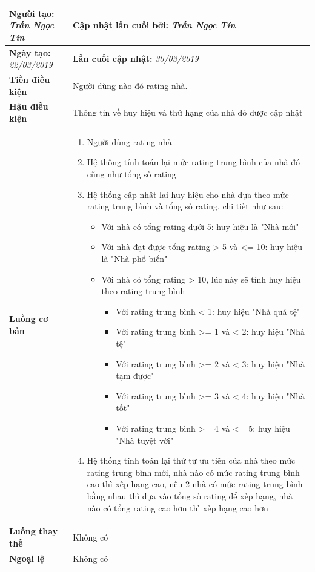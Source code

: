 \begin{enumerate}[label=\textbf{(\alph*)}]
\begin{center}
\begin{longtable}{ | l |p{10cm}|}
			\textbf{Người tạo:} \textit{Trần Ngọc Tín} & \textbf{Cập nhật lần cuối bởi:} \textit{Trần Ngọc Tín} \\ \hline
			\textbf{Ngày tạo:} \textit{22/03/2019} & \textbf{Lần cuối cập nhật:} \textit{30/03/2019} \\ \hline
			\textbf{Tiền điều kiện} &  Người dùng nào đó rating nhà. \\ \hline 
			\textbf{Hậu điều kiện} &  Thông tin về huy hiệu và thứ hạng của nhà đó được cập nhật \\ \hline 
			\textbf{Luồng cơ bản} & 
			\begin{enumerate}
		\item Người dùng rating nhà
		\item Hệ thống tính toán lại mức rating trung bình của nhà đó cũng như tổng số rating
		\item Hệ thống cập nhật lại huy hiệu cho nhà dựa theo mức rating trung bình và tổng số rating, chi tiết như sau:
		\begin{itemize}
		    \item Với nhà có tổng rating dưới 5: huy hiệu là "Nhà mới"
		    \item Với nhà đạt được tổng rating > 5 và <= 10: huy hiệu là "Nhà phổ biến"
		    \item Với nhà có tổng rating > 10, lúc này sẽ tính huy hiệu theo rating trung bình
		    \begin{itemize}
		        \item Với rating trung bình < 1: huy hiệu "Nhà quá tệ"
		        \item Với rating trung bình >= 1 và < 2: huy hiệu "Nhà tệ"
		        \item Với rating trung bình >= 2 và < 3: huy hiệu "Nhà tạm được"
		        \item Với rating trung bình >= 3 và < 4: huy hiệu "Nhà tốt"
		        \item Với rating trung bình >= 4 và <= 5: huy hiệu "Nhà tuyệt vời"
		    \end{itemize}
		\end{itemize}
		\item Hệ thống tính toán lại thứ tự ưu tiên của nhà theo mức rating trung bình mới, nhà nào có mức rating trung bình cao thì xếp hạng cao, nếu 2 nhà có mức rating trung bình bằng nhau thì dựa vào tổng số rating để xếp hạng, nhà nào có tổng rating cao hơn thì xếp hạng cao hơn
			\end{enumerate} \\ \hline
			\textbf{Luồng thay thế} & Không có \\ \hline
			\textbf{Ngoại lệ}  & Không có \\
			\hline
		\end{longtable}
	\end{center}
\end{enumerate}